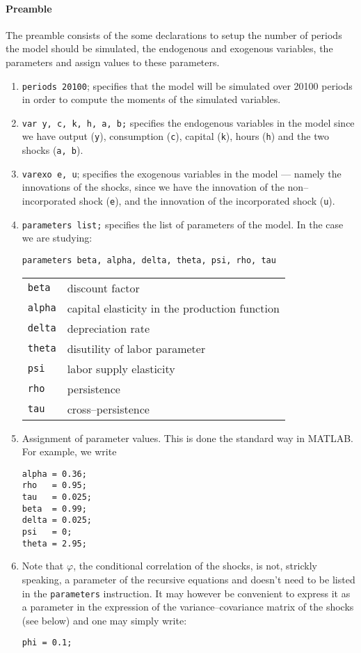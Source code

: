 \documentclass[11pt,a4paper]{article}
\begin{document}
\paragraph{Preamble}
The preamble consists of the some declarations to setup the number of periods the model should be simulated, the endogenous and exogenous variables, the parameters and assign values to these parameters. 
\begin{enumerate}
\item {\tt periods 20100}; specifies that the model will be simulated over 20100 periods in order to compute the moments of the simulated variables.
\item {\tt var y, c, k, h, a, b;} specifies the endogenous variables in the model since we have output ({\tt y}), consumption ({\tt c}), capital ({\tt k}), hours ({\tt h}) and the two shocks ({\tt a, b}).
\item {\tt varexo e, u}; specifies the exogenous variables in the model --- namely the innovations of the shocks, since we have the innovation of the non--incorporated shock ({\tt e}), and the innovation of the incorporated shock ({\tt u}).
\item {\tt parameters list;} specifies the list of parameters of the model. In the case we are studying:

{\tt parameters beta, alpha, delta, theta, psi, rho, tau}

\begin{tabular}{ll}
\hline
\hline
{\tt beta}  & discount factor                               \\
{\tt alpha} & capital elasticity in the production function \\
{\tt delta} & depreciation rate                             \\
{\tt theta} & disutility of labor parameter                 \\
{\tt psi}   & labor supply elasticity                       \\
{\tt rho}   & persistence                                   \\
{\tt tau}   & cross--persistence                            \\
\hline
\hline
\end{tabular}
\item Assignment of parameter values. This is done the standard way in MATLAB. For example, we write

\begin{verbatim}
alpha = 0.36;
rho   = 0.95;
tau   = 0.025;
beta  = 0.99;
delta = 0.025;
psi   = 0;
theta = 2.95;
\end{verbatim}


\item Note that $\varphi$, the conditional correlation of the shocks, is not, strickly speaking, a parameter of the recursive equations and doesn't need to be listed in the {\tt parameters} instruction. It may however be convenient to express it as a parameter in the expression of the variance--covariance matrix of the shocks (see below) and one may simply write:

{\tt phi = 0.1; }

\end{enumerate}
\end{document}
